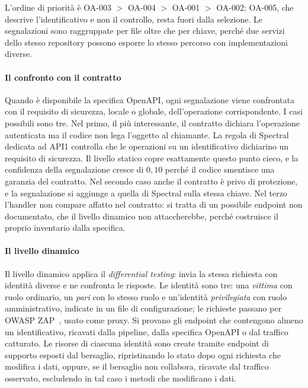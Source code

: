 L'ordine di priorità è OA-003 $>$ OA-004 $>$ OA-001 $>$ OA-002; OA-005, che
descrive l'identificativo e non il controllo, resta fuori dalla selezione. Le
segnalazioni sono raggruppate per file oltre che per chiave, perché due servizi
dello stesso repository possono esporre lo stesso percorso con implementazioni
diverse.

\paragraph{Il confronto con il contratto}
Quando è disponibile la specifica OpenAPI, ogni segnalazione viene confrontata
con il requisito di sicurezza, locale o globale, dell'operazione
corrispondente. I casi possibili sono tre. Nel primo, il più interessante, il
contratto dichiara l'operazione autenticata ma il codice non lega l'oggetto al
chiamante. La regola di Spectral~\cite{spectral2026docs} dedicata ad API1
controlla che le operazioni su un identificativo dichiarino un
requisito di sicurezza. Il livello statico
copre esattamente questo punto cieco, e la confidenza della segnalazione cresce
di $0{,}10$ perché il codice smentisce una garanzia del contratto. Nel secondo
caso anche il contratto è privo di protezione, e la segnalazione si aggiunge a
quella di Spectral sulla stessa chiave. Nel terzo l'handler non compare affatto
nel contratto: si tratta di un possibile endpoint non documentato, che il
livello dinamico non attaccherebbe, perché costruisce il proprio inventario
dalla specifica.

\paragraph{Il livello dinamico}
Il livello dinamico applica il \emph{differential testing}: invia la stessa
richiesta con identità diverse e ne confronta le risposte. Le identità sono
tre: una \emph{vittima} con ruolo ordinario, un \emph{pari} con lo stesso ruolo
e un'identità \emph{privilegiata} con ruolo amministrativo, indicate in un file
di configurazione; le richieste passano per OWASP ZAP~\cite{zap2026docs}, usato
come proxy. Si provano gli endpoint che contengono almeno un identificativo,
ricavati dalla pipeline, dalla specifica OpenAPI o dal traffico catturato. Le
risorse di ciascuna identità sono create tramite endpoint di supporto esposti
dal bersaglio, ripristinando lo stato dopo ogni richiesta che modifica i dati,
oppure, se il bersaglio non collabora, ricavate dal traffico osservato,
escludendo in tal caso i metodi che modificano i dati.

